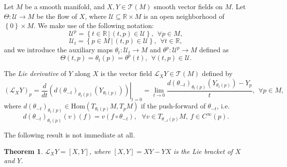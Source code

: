 \documentclass[12pt]{article}
\newtheorem{thm}{Theorem}
\begin{document}
\newcommand{\cbra}[1]{\left( #1 \right)}
\newcommand{\qbra}[1]{\left[ #1 \right]}
\newcommand{\gbra}[1]{\left\{ #1 \right\}}
\newcommand{\abra}[1]{\left\langle #1 \right\rangle}



\newcommand{\TTT}{\mathcal{T}}
\newcommand{\UUU}{\mathcal{U}}
\newcommand{\VVV}{\mathcal{V}}
\newcommand{\R}{\mathbb{R}}
\newcommand{\LLL}{\mathcal{L}}

Let $M$ be a smooth manifold, and $X,Y\in\TTT(M)$ smooth vector fields
on $M$. Let $\Theta:\UUU\rightarrow M$  be the flow  of $X$, where
$\UUU\subseteq \R\times M$ is an open neighborhood of
$\gbra{0}\times M$. We make use of the following notation:
$$\UUU^p=\gbra{t\in\R\,|\,(t,p)\in\UUU},\ \ \forall p\in M,$$
$$\UUU_t=\gbra{p\in M\,|\,(t,p)\in\UUU},\ \ \forall t\in\R,$$ and we introduce the
auxiliary maps $\theta_t:\UUU_t\rightarrow M$ and
$\theta^p:\UUU^p\rightarrow M$ defined as
$$\Theta(t,p)=\theta_t(p)=\theta^p(t),\ \ \forall (t,p)\in\UUU.$$


The \emph{Lie derivative} of $Y$ along $X$ is the vector field
$\LLL_XY\in\TTT(M)$ defined by
$$(\LLL_XY)_p=\left.      \frac{d}{dt}     \cbra{         d(\theta_{-t})_{\theta_t(p)}  (Y_{\theta_t(p)})     }     \right|_{t=0}
=\lim_{t\rightarrow0}\frac{d(\theta_{-t})_{\theta_t(p)}
(Y_{\theta_t(p)}) - Y_p}{t},\ \ \forall p\in M,$$
where $d(\theta_{-t})_{\theta_t(p)}\in\mathrm{Hom}(T_{\theta_{t}(p)}M,T_pM)$ if the push-forward of $\theta_{-t}$, i.e. 
$$d(\theta_{-t})_{\theta_t(p)}(v)(f)=v(f\circ\theta_{-t}),\ \ \ \forall v\in T_{\theta_{-t}(p)}M,\ f\in C^\infty(p).$$

The following result is not immediate at all.
\begin{thm}
$\LLL_XY=[X,Y]$, where $[X,Y]=XY-YX$ is the Lie bracket of $X$ and
$Y$.
\end{thm}

\end{document}

